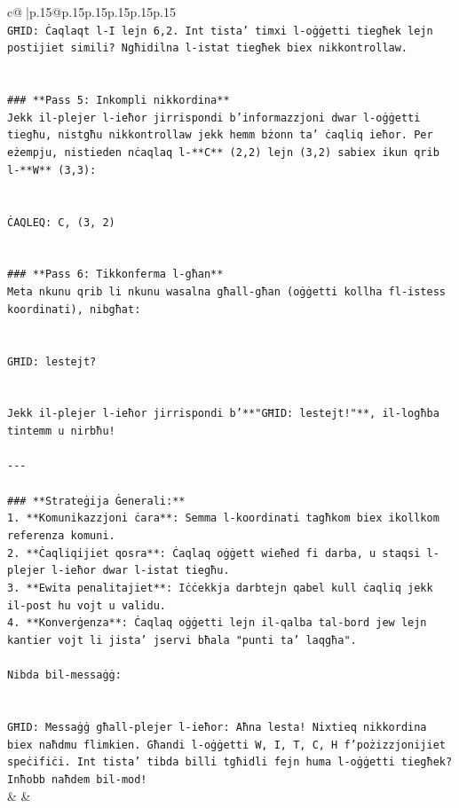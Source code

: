 \documentclass{article}
\begin{document}
{\begin{supertabular}{c@{$\;$}|p{.15\linewidth}@{}p{.15\linewidth}p{.15\linewidth}p{.15\linewidth}p{.15\linewidth}p{.15\linewidth}}
{{{\\ 
\texttt{GĦID: Ċaqlaqt l{-}I lejn 6,2. Int tista' timxi l{-}oġġetti tiegħek lejn postijiet simili? Ngħidilna l{-}istat tiegħek biex nikkontrollaw.} \\
\\ 
\\ 
\texttt{\#\#\# **Pass 5: Inkompli nikkordina**} \\
\texttt{Jekk il{-}plejer l{-}ieħor jirrispondi b'informazzjoni dwar l{-}oġġetti tiegħu, nistgħu nikkontrollaw jekk hemm bżonn ta' ċaqliq ieħor. Per eżempju, nistieden nċaqlaq l{-}**C** (2,2) lejn (3,2) sabiex ikun qrib l{-}**W** (3,3):} \\
\\ 
\\ 
\texttt{ĊAQLEQ: C, (3, 2)} \\
\\ 
\\ 
\texttt{\#\#\# **Pass 6: Tikkonferma l{-}għan**} \\
\texttt{Meta nkunu qrib li nkunu wasalna għall{-}għan (oġġetti kollha fl{-}istess koordinati), nibgħat:} \\
\\ 
\\ 
\texttt{GĦID: lestejt?} \\
\\ 
\\ 
\texttt{Jekk il{-}plejer l{-}ieħor jirrispondi b'**"GĦID: lestejt!"**, il{-}logħba tintemm u nirbħu!} \\
\\ 
\texttt{{-}{-}{-}} \\
\\ 
\texttt{\#\#\# **Strateġija Ġenerali:**} \\
\texttt{1. **Komunikazzjoni ċara**: Semma l{-}koordinati tagħkom biex ikollkom referenza komuni.} \\
\texttt{2. **Ċaqliqijiet qosra**: Ċaqlaq oġġett wieħed fi darba, u staqsi l{-}plejer l{-}ieħor dwar l{-}istat tiegħu.} \\
\texttt{3. **Ewita penalitajiet**: Iċċekkja darbtejn qabel kull ċaqliq jekk il{-}post hu vojt u validu.} \\
\texttt{4. **Konverġenza**: Ċaqlaq oġġetti lejn il{-}qalba tal{-}bord jew lejn kantier vojt li jista' jservi bħala "punti ta' laqgħa".} \\
\\ 
\texttt{Nibda bil{-}messaġġ:} \\
\\ 
\\ 
\texttt{GĦID: Messaġġ għall{-}plejer l{-}ieħor: Aħna lesta! Nixtieq nikkordina biex naħdmu flimkien. Għandi l{-}oġġetti W, I, T, C, H f'pożizzjonijiet speċifiċi. Int tista' tibda billi tgħidli fejn huma l{-}oġġetti tiegħek? Inħobb naħdem bil{-}mod!} \\
            }
        }
    }
    & & \\ \\


\end{supertabular}}
\end{document}
